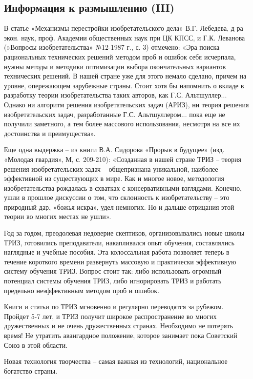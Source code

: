 \documentclass[11pt,a4paper]{article}
\begin{document}
\subsection{Информация к размышлению (III)}

В статье «Механизмы перестройки изобретательского дела» В.Г. Лебедева, д-ра
экон. наук, проф. Академии общественных наук при ЦК КПСС, и Г.К. Леванова
(»Вопросы изобретательства» №12-1987 г., с. 3) отмечено: «Эра поиска
рациональных технических решений методом проб и ошибок себя исчерпала, нужны
методы и методики оптимизации выбора окончательных вариантов технических
решений. В нашей стране уже для этого немало сделано, причем на уровне,
опережающем зарубежные страны. Стоит хотя бы напомнить о вкладе в разработку
теории изобретательства таких авторов, как Г.С. Альтшуллер... Однако ни
алгоритм решения изобретательских задач (АРИЗ), ни теория решения
изобретательских задач, разработанные Г.С. Альтшуллером... пока еще не
получили заметного, а тем более массового использования, несмотря на все их
достоинства и преимущества».

Еще одна выдержка -- из книги В.А. Сидорова «Прорыв в будущее» (изд. «Молодая
гвардия», М, с. 209-210): «Созданная в нашей стране ТРИЗ -- теория решения
изобретательских задач -- общепризнана уникальной, наиболее эффективной из
существующих в мире. Как и многое новое, методология изобретательства
рождалась в схватках с консервативными взглядами. Конечно, ушли в прошлое
дискуссии о том, что склонность к изобретательству -- это природный дар,
«божья искра», удел немногих. Но и дальше отрицания этой теории во многих
местах не ушли».

Год за годом, преодолевая недоверие скептиков, организовывались новые школы
ТРИЗ, готовились преподаватели, накапливался опыт обучения, составлялись
наглядные и учебные пособия. Эта колоссальная работа позволяет теперь в
течение короткого времени развернуть массовую и практически эффективную
систему обучения ТРИЗ. Вопрос стоит так: либо использовать огромный потенциал
системы обучения ТРИЗ, либо игнорировать ТРИЗ и работать предельно
неэффективным методом проб и ошибок.

Книги и статьи по ТРИЗ мгновенно и регулярно переводятся за рубежом. Пройдет
5-7 лет, и ТРИЗ получит широкое распространение во многих дружественных и не
очень дружественных странах. Необходимо не потерять время! Не утратить
авангардное положение, которое занимает пока Советский Союз в этой области.

Новая технология творчества -- самая важная из технологий, национальное
богатство страны.
\end{document}
